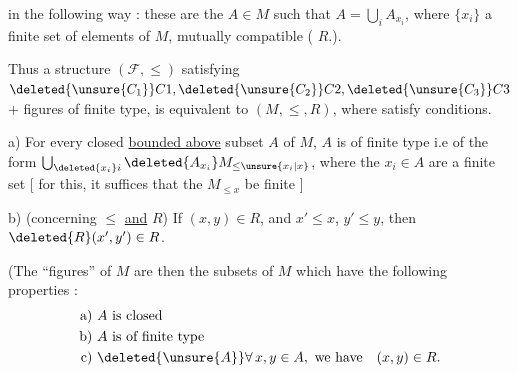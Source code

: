 in the following way : these are the $A\in M$ such that $A=\bigcup_i A_{x_i}$, where  $\{x_i\}$  a finite set of elements of $M$, mutually compatible ( $R$.).

Thus a structure $(\mathcal F,\leq)$ satisfying $\deleted{\unsure{C_1}}C1,\deleted{\unsure{C_2}}C2,\deleted{\unsure{C_3}}C3$ + figures  of finite type, is equivalent to $(M,\leq,R)$, where   satisfy  conditions.

a)  For every closed \uline{bounded above} subset $A$\deleted{\unsure{,}} of $M$, $A$ is of finite type i.e of the form $\bigcup_{\deleted{x_i}i}\deleted{A_{x_i}}M_{\leq\unsure{x_i|x}}$, where the $x_i\in A$  are a finite set [ for this, it suffices that the $M_{\leq x}$ be finite ]


b) (concerning $\leq$ \uline{and} $R$) If $(x,y)\in R$, and $x'\leq x$, $y'\leq y$, then $\deleted{R}(x',y')\in R$.


(The ``figures'' of $M$ are then the  subsets  of $M$ which have the following properties :
\[
\begin{aligned}
\text{a) } & A\text{ is closed}\\
\text{b) } & A\text{ is of finite type}\\
\text{c) } & \deleted{\unsure{A}}\forall\,x,y\in A,\ \text{we have}\quad (x,y)\in R.
\end{aligned}
\]
